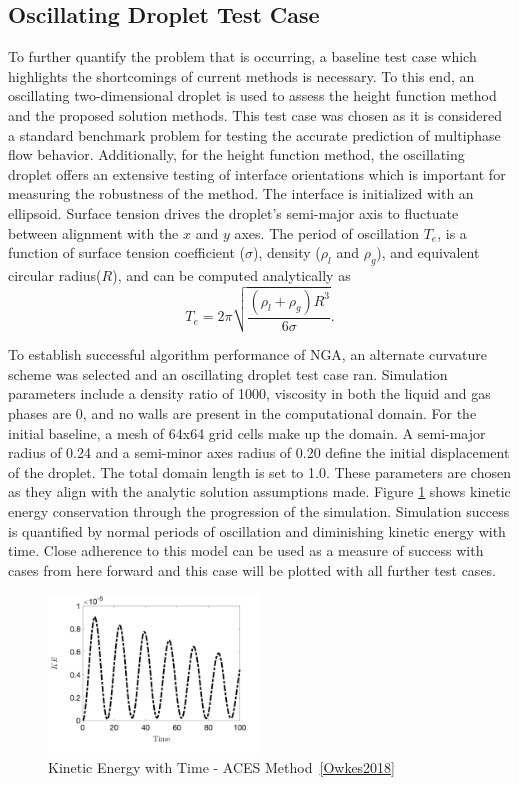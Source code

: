 \subsection{Oscillating Droplet Test Case}
To further quantify the problem that is occurring, a baseline test case which highlights the shortcomings of current methods is necessary. To this end, an oscillating two-dimensional droplet is used to assess the height function method and the proposed solution methods. This test case was chosen as it is considered a standard benchmark problem for testing the accurate prediction of multiphase flow behavior\cite{Salih2002}. Additionally, for the height function method, the oscillating droplet offers an extensive testing of interface orientations which is important for measuring the robustness of the method. The interface is initialized with an ellipsoid. Surface tension drives the droplet's semi-major axis to fluctuate between alignment with the $x$ and $y$ axes. The period of oscillation $T_{e}$, is a function of surface tension coefficient ($\sigma$), density ($\rho_l$ and $\rho_g$), and equivalent circular radius($R$), and can be computed analytically as~\cite{Rayleigh}
\begin{equation}
T_{e} = 2 \pi \sqrt{\frac{(\rho_{l}+\rho_{g})R^3}{6\sigma}}.
\label{period}
\end{equation}

To establish successful algorithm performance of NGA, an alternate curvature scheme was selected and an oscillating droplet test case ran. Simulation parameters include a density ratio of 1000, viscosity in both the liquid and gas phases are 0, and no walls are present in the computational domain. For the initial baseline, a mesh of 64x64 grid cells make up the domain. A semi-major radius of 0.24 and a semi-minor axes radius of 0.20 define the initial displacement of the droplet. The total domain length is set to 1.0. These parameters are chosen as they align with the analytic solution assumptions made. Figure \ref{fig:acesKE} shows kinetic energy conservation through the progression of the simulation. Simulation success is quantified by normal periods of oscillation and diminishing kinetic energy with time. Close adherence to this model can be used as a measure of success with cases from here forward and this case will be plotted with all further test cases. 
\begin{figure}[h]
	\centering
	\includegraphics[width=0.5\textwidth]{figs/ACES_KEplot.png}
	\caption{Kinetic Energy with Time - ACES Method~\ref{Owkes2018}}
	\label{fig:acesKE}
\end{figure}

